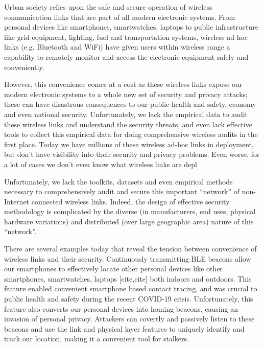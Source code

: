 Urban society relies upon the safe and secure operation of wireless communication links that are part of all modern electronic systems. From personal devices like smartphones, smartwatches, laptops to public infrastructure like grid equipment, lighting, fuel and transportation systems, wireless ad-hoc links (e.g. Bluetooth and WiFi) have given users within wireless range a capability to remotely monitor and access the electronic equipment safely and conveniently. 

However, this convenience comes at a cost as these wireless links expose our modern electronic systems to a whole new set of security and privacy attacks; these can have disastrous consequences to our public health and safety, economy and even national security. 
Unfortunately, we lack the empirical data to audit these wireless links and understand the security threats, and even lack effective tools to collect this empirical data for doing comprehensive wireless audits in the first place. Today we have millions of these wireless ad-hoc links in deployment, but don’t have visibility into their security and privacy problems. Even worse, for a lot of cases we don’t even know what wireless links are depl

Unfortunately, we lack the toolkits, datasets and even empirical methods necessary to comprehensively audit and secure this important “network” of non-Internet connected wireless links. Indeed, the design of effective security methodology is complicated by the diverse (in manufacturers, end uses, physical hardware variations) and distributed (over large geographic area) nature of this “network”.

There are several examples today that reveal the tension between convenience of wireless links and their security. Continuously transmitting BLE beacons allow our smartphones to effectively locate other personal devices like other smartphones, smartwatches, laptops [cite,cite] both indoors and outdoors. This feature enabled convenient smartphone based contact tracing, and was crucial to public health and safety during the recent COVID-19 crisis. Unfortunately, this feature also converts our personal devices into homing beacons, causing an invasion of personal privacy. Attackers can covertly and passively listen to these beacons and use the link and physical layer features to uniquely identify and track our location, making it a convenient tool for stalkers.

